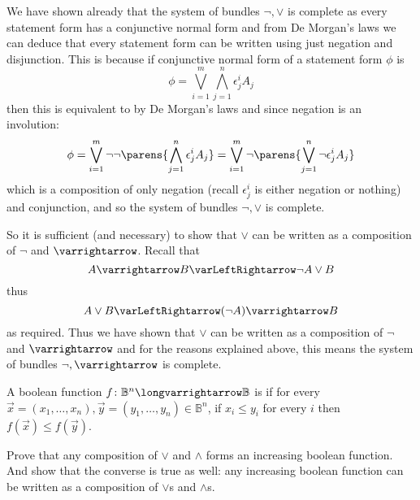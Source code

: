 \documentclass[10pt]{article}
\let\eiff=\varLeftRightarrow
\let\to=\varrightarrow
\let\longto=\longvarrightarrow
\def\bB{\mathbb{B}}
\begin{document}
\begin{blankpp}

    We have shown already that the system of bundles $\neg,\lor$ is complete as every statement form has a conjunctive normal form and from De Morgan's laws we can deduce that every statement form can be
    written using just negation and disjunction.
    This is because if conjunctive normal form of a statement form $\phi$ is
    \[ \phi = \bigvee_{i=1}^m\bigwedge_{j=1}^n\epsilon_j^i A_j \]
    then this is equivalent to by De Morgan's laws and since negation is an involution:
    \[ \phi = \bigvee_{i=1}^m\neg\neg\parens{\bigwedge_{j=1}^n\epsilon_j^i A_j} = \bigvee_{i=1}^m\neg\parens{\bigvee_{j=1}^n\neg\epsilon_j^i A_j} \]
    which is a composition of only negation (recall $\epsilon_j^i$ is either negation or nothing) and conjunction, and so the system of bundles $\neg,\lor$ is complete.

    So it is sufficient (and necessary) to show that $\lor$ can be written as a composition of $\neg$ and $\to$.
    Recall that
    \[ A\to B \eiff \neg A\lor B \]
    thus
    \[ A\lor B \eiff (\neg A)\to B \]
    as required.
    Thus we have shown that $\lor$ can be written as a composition of $\neg$ and $\to$ and for the reasons explained above, this means the system of bundles $\neg,\to$ is complete.

\end{blankpp}

\begin{exercise*}

    \begin{defn}
        A boolean function $f\colon\bB^n\longto\bB$ is  if for every $\vec x=(x_1,\dots,x_n), \vec y=(y_1,\dots,y_n)\in\bB^n$, if $x_i\leq y_i$ for every $i$ then
        $f(\vec x)\leq f(\vec y)$.
    \end{defn}
    Prove that any composition of $\lor$ and $\land$ forms an increasing boolean function.
    And show that the converse is true as well: any increasing boolean function can be written as a composition of $\lor$s and $\land$s.

\end{exercise*}
\end{document}
